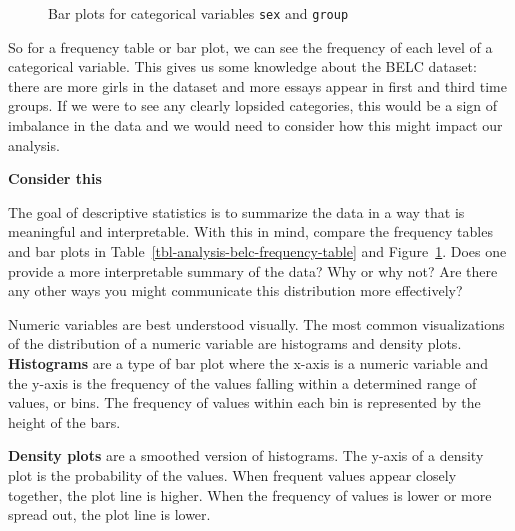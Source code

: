 \documentclass[
  letterpaper,
  krantz1]{latex/krantz-mod}
\theoremstyle{definition}
\theoremstyle{definition}
\theoremstyle{remark}
\begin{document}
\begin{figure}[!htb]
\begin{minipage}{0.50\linewidth}
{}


\end{minipage}%

\caption{\label{fig-analysis-belc-barplots}Bar plots for categorical
variables \texttt{sex} and \texttt{group}}

\end{figure}%

So for a frequency table or bar plot, we can see the frequency of each
level of a categorical variable. This gives us some knowledge about the
BELC dataset: there are more girls in the dataset and more essays appear
in first and third time groups. If we were to see any clearly lopsided
categories, this would be a sign of imbalance in the data and we would
need to consider how this might impact our analysis.

\begin{tcolorbox}[enhanced jigsaw, toprule=.15mm, breakable, colback=white, arc=.35mm, left=2mm, colframe=quarto-callout-color-frame, opacityback=0, bottomrule=.15mm, rightrule=.15mm, leftrule=.75mm]

\textbf{ Consider this}

The goal of descriptive statistics is to summarize the data in a way
that is meaningful and interpretable. With this in mind, compare the
frequency tables and bar plots in
Table~\ref{tbl-analysis-belc-frequency-table} and
Figure~\ref{fig-analysis-belc-barplots}. Does one provide a more
interpretable summary of the data? Why or why not? Are there any other
ways you might communicate this distribution more effectively?

\end{tcolorbox}

Numeric variables are best understood visually.
The most common visualizations of the distribution of a numeric variable
are histograms and density plots. \textbf{Histograms}
are a type of bar plot where the x-axis is a numeric variable and the
y-axis is the frequency of the values falling within a determined range
of values, or bins. The frequency of values within each bin is
represented by the height of the bars.

\textbf{Density plots} are a smoothed version of
histograms. The y-axis of a density plot is the probability of the
values. When frequent values appear closely together, the plot line is
higher. When the frequency of values is lower or more spread out, the
plot line is lower.
\end{document}
